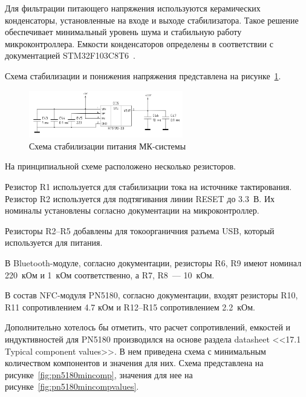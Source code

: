 Для фильтрации питающего напряжения используются керамических конденсаторы, установленные на входе и выходе стабилизатора.
Такое решение обеспечивает минимальный уровень шума и стабильную работу микроконтроллера.
Емкости конденсаторов определены в соответствии с документацией STM32F103C8T6~\cite{stm32f103_datasheet}.

Схема стабилизации и понижения напряжения представлена на рисунке~\ref{fig:mk_usb_stab}.

\begin{figure}[H]
    \centering
    \includegraphics[width=0.6\textwidth]{images/design/mk_usb_stab}
    \caption{\centering Схема стабилизации питания МК-системы}
    \label{fig:mk_usb_stab}
\end{figure}


На принципиальной схеме расположено несколько резисторов.

Резистор R1 используется для стабилизации тока на источнике тактирования.
Резистор R2 используется для подтягивания линии RESET до 3.3~В.
Их номиналы установлены согласно документации на микроконтроллер\cite{stm32f103_datasheet}.

Резисторы R2--R5 добавлены для токоорганичния разъема USB, который используется для питания.

В Bluetooth-модуле, согласно документации, резисторы R6, R9 имеют номинал 220~кОм и 1~кОм соответственно, а R7, R8~--- 10~кОм.

В состав NFC-модуля PN5180, согласно документации, входят резисторы R10, R11 сопротивлением 4.7 кОм и R12--R15 сопротивлением 2.2~кОм.

Дополнительно хотелось бы отметить, что расчет сопротивлений, емкостей и индуктивностей для PN5180 производился на основе раздела datasheet <<17.1 Typical component values>>\cite{pn5180_datasheet}.
В нем приведена схема с минимальным количеством компонентов и значения для них.
Схема представлена на рисунке~\ref{fig:pn5180mincomp}, значения для нее на рисунке~\ref{fig:pn5180mincompvalues}.


